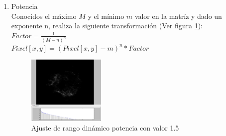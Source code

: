 \begin{enumerate}
		\item Potencia\\
		Conocidos el máximo $M$ y el mínimo $m$ valor en la matríz y dado
		un exponente n, realiza la siguiente transformación (Ver figura \ref{fig:HDRPOW}):
		\\
			$Factor=\frac{1}{(M-n)^{n}}$
			\\
			$Pixel[x,y]=(Pixel[x,y]-m)^{n}*Factor$
			\begin{figure}[!htb]
				\centering
				\includegraphics[width=0.35\textwidth]{images/HDREQ/chandraPow1_5.PNG}
				\caption{\label{fig:HDRPOW}Ajuste de rango dinámico potencia con valor 1.5}
			\end{figure}


\end{enumerate}
